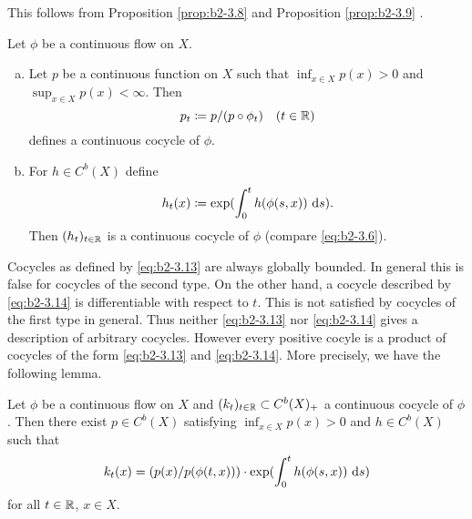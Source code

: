 This follows from Proposition \ref{prop:b2-3.8} and Proposition \ref{prop:b2-3.9} .

\begin{example}\label{ex:b2-3.11}
Let $\phi$ be a continuous flow on $X$.
\begin{enumerate}[a), wide, labelsep=1em]
\item \label{ex:b2-3.11-1}
Let $p$ be a continuous function on $X$ such that $\inf_{x \in X} p(x) > 0$ and $\sup_{x \in X} p(x) < \infty$.
Then
\begin{equation}\label{eq:b2-3.13}
p_{t} \coloneqq p/(p \circ \phi_{t}) \quad (t \in \mathbb{R})
\end{equation}
defines a continuous cocycle of $\phi$.
\item \label{ex:b2-3.11-2}
For $h \in C^{b}(X)$ define
\begin{equation}\label{eq:b2-3.14}
h_{t}(x) \coloneqq \exp(\int_{0}^{t} h(\phi(s,x))\, \mathop{}\!\mathrm{d}{s}).
\end{equation}
Then $(h_{t})_{t \in \mathbb{R}}$ is a continuous cocycle of $\phi$ (compare \eqref{eq:b2-3.6}).
\end{enumerate}
\end{example}

Cocycles as defined by \eqref{eq:b2-3.13} are always globally bounded.
In general this is false for cocycles of the second type.
On the other hand, a cocycle described by \eqref{eq:b2-3.14} is differentiable with respect to $t$.
This is not satisfied by cocycles of the first type in general.
Thus neither \eqref{eq:b2-3.13} nor \eqref{eq:b2-3.14} gives a description of arbitrary cocycles.
However every positive cocyle is a product of cocycles of the form \eqref{eq:b2-3.13} and \eqref{eq:b2-3.14}.
More precisely, we have the following lemma.

\begin{lemma}\label{lem:b2-3.12}
Let $\phi$ be a continuous flow on $X$ and $(k_{t})_{t \in \mathbb{R}} \subset C^{b}(X)_{+}$ a continuous cocycle of $\phi$.
Then there exist $p \in C^{b}(X)$ satisfying $\inf_{x \in X} p(x) > 0$ and $h \in C^{b}(X)$ such that
\begin{equation}\label{eq:b2-3.15}
k_{t}(x) = (p(x)/p(\phi(t,x))) \cdot \exp(\int_{0}^{t} h(\phi(s,x))\, \mathop{}\!\mathrm{d}{s})
\end{equation}
for all $t \in \mathbb{R}$, $x \in X$.
\end{lemma}

